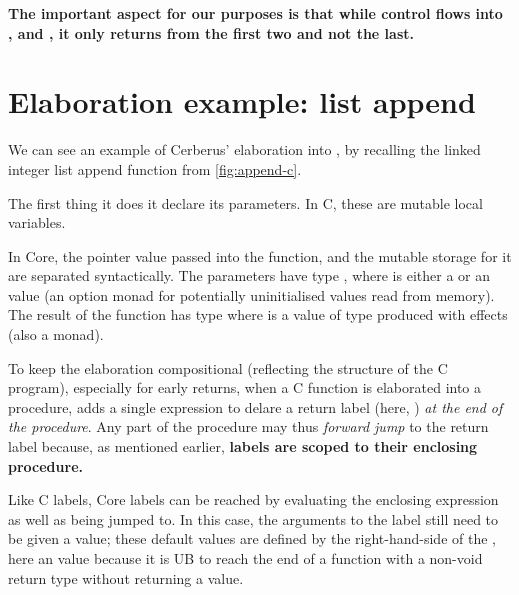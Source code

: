 \textbf{The important aspect for our purposes is that while control flows into
,  and , it %
only returns from the first two and not the last.}

\section{Elaboration example: list append}

We can see an example of Cerberus' elaboration into , by recalling the
linked integer list append function from \cref{fig:append-c}.

The first thing it does it declare its parameters. In C, these are mutable
local variables.


In Core, the pointer value passed into the function, and the mutable storage
for it are separated syntactically. The parameters have type
, where  is either a
 or an  value %
(an option monad for potentially uninitialised values read from memory). The
result of the function has type  where
 is a value of type  produced with effects
(also a monad).


To keep the elaboration compositional (reflecting the structure of the C
program), especially for early returns, when a C function is elaborated into a
 procedure,  adds a single  %
expression to delare a return label (here, ) \emph{at the
end of the procedure}. Any part of the procedure may thus \emph{forward jump}
to the return label because, as mentioned earlier, \textbf{labels are scoped to
their enclosing procedure.}

Like C labels, Core labels can be reached by evaluating the enclosing
expression as well as being jumped to. In this case, the arguments to the label
still need to be given a value; these default values are defined by the
right-hand-side of the \coreinline{:=}, here an  %
value because it is UB to reach the end of a function with a non-void return
type without returning a value.


